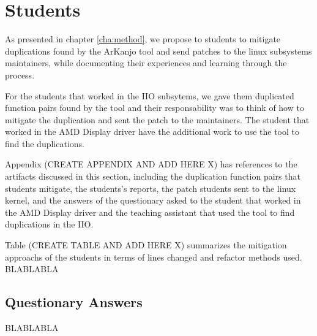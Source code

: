 \section{Students}

As presented in chapter \ref{cha:method}, we propose to students to mitigate duplications
found by the ArKanjo tool and send patches to the linux subsystems maintainers, while
documenting their experiences and learning through the process. 

For the students that worked
in the IIO subsytems, we gave them duplicated function pairs found by the tool and their 
responsability was to think of how to mitigate the duplication and sent the patch to the 
maintainers. The student that worked in the AMD Display driver have the additional work
to use the tool to find the duplications.

Appendix (CREATE APPENDIX AND ADD HERE X) has references
to the artifacts discussed in this section, including the duplication function pairs that students 
mitigate, the students's reports, the patch students sent to the linux kernel, and the 
answers of the questionary asked to the student that worked in the AMD Display driver and the 
teaching assistant that used the tool to find duplications in the IIO.



Table (CREATE TABLE AND ADD HERE X) summarizes the mitigation approachs of the students in terms 
of lines changed and refactor methods used. BLABLABLA


\subsection{Questionary Answers}

BLABLABLA
